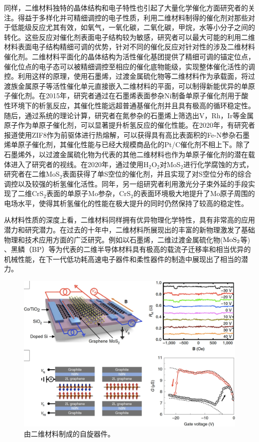     同样，二维材料独特的晶体结构和电子特性也引起了大量化学催化方面研究者的关注。得益于多样化并可精细调控的电子性质，利用二维材料制得的催化剂对那些对于低能级反应尤其有效，如氧气，一氧化碳，二氧化碳，甲烷，水等小分子之间的转化。这些反应对催化剂表面电子结构较为敏感，研究者可以最大可能的利用二维材料表面电子结构精细可调的优势，针对不同的催化反应对针对性的涉及二维材料催化剂。二维材料平面化的晶体结构为活性催化基团提供了精细可调的锚定位点，催化位点的电子态可以被精细调控至相应的催化底物能级，实现整体催化活性的调控。利用这样的原理，使用石墨烯，过渡金属硫化物等二维材料作为承载面，将过渡族金属原子等活性催化单元直接嵌入二维材料的平面，可以制得新能优异的单原子催化剂。在2015年，研究者通过在石墨烯表面参杂Ni制备单原子催化剂用于酸性环境下的析氢反应，其催化性能远超普通基催化剂并且具有极高的循环稳定性。随后，通过系统的理论计算，研究者在氮参杂的石墨烯上筛选出V，Rh，Ir等金属原子作为单原子催化剂，可以显著提升析氢反应的催化性能。在2020年，有研究者报道使用ZIF8作为前驱体进行热熔解，可以获得具有高比表面积的Fe-N参杂石墨烯单原子催化剂，其催化性能与已经大规模商品化的Pt/C催化剂不相上下。除了石墨烯外，以过渡金属硫化物为代表的其他二维材料也作为单原子催化剂的潜在载体进入了研究者的视线。在2020年，通过使用H$_2$O$_2$对MoS$_2$进行化学腐蚀的方式，研究者在二维MoS$_2$表面获得了单S空位的催化剂，并且实现了对S空位分布的综合调控以及较强的析氢催化活性。同年，另一组研究者利用激光分子束外延的手段实现了二维CrS$_2$表面的单原子Mo参杂，CrS$_2$的表面环境极大地提升了Mo原子周围的电场水平，使得其析氢催化的性能在极大提升的同时仍然保持了较高的稳定性。

    从材料性质的深度上看，二维材料同样拥有优异物理化学特性，具有非常高的应用潜力和研究潜力。在过去的十年中，二维材料所展现出的丰富的新物理激发了基础物理和技术应用方面的广泛研究。例如以石墨烯，二维过渡金属硫化物($\rm{MoS_{2}}$等) 、黑鳞（BP）等为代表的二维半导体材料具有极高的载流子迁移率和相当优异的机械性能，在下一代低功耗高速电子器件和柔性器件的制造中展现出了相当的潜力。
    
    \begin{figure}[htb]
        \includegraphics{pic/INTRO_SPIN.png}
        \caption{由二维材料制成的自旋器件。}
    \end{figure}


